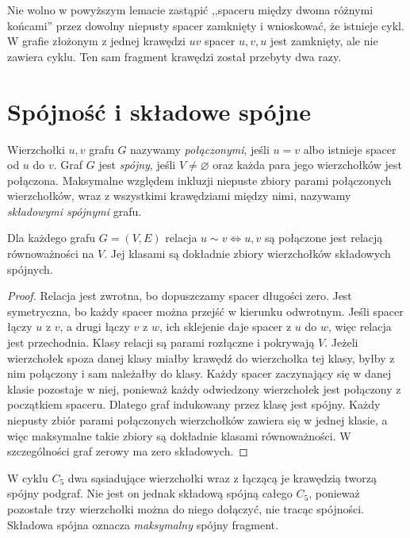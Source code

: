 \begin{uwaga}
Nie wolno w powyższym lemacie zastąpić ,,spaceru między
dwoma różnymi końcami'' przez dowolny niepusty spacer
zamknięty i wnioskować, że istnieje cykl. W grafie złożonym z jednej krawędzi $uv$
spacer $u,v,u$ jest zamknięty, ale nie zawiera cyklu.
Ten sam fragment krawędzi został przebyty dwa razy.
\end{uwaga}

\section{Spójność i składowe spójne}
\label{sec:tg-spojnosc}

\begin{definicja}[Spójność]
Wierzchołki $u,v$ grafu $G$ nazywamy
\emph{połączonymi}, jeśli $u=v$ albo istnieje
spacer od $u$ do $v$. Graf $G$ jest \emph{spójny},
jeśli $V\ne\varnothing$ oraz każda para jego wierzchołków jest połączona.
Maksymalne względem inkluzji niepuste zbiory parami połączonych
wierzchołków, wraz z wszystkimi krawędziami między nimi,
nazywamy \emph{składowymi spójnymi} grafu.
\end{definicja}

\begin{stwierdzenie}
Dla każdego grafu $G=(V,E)$ relacja
$u\sim v\iff u,v$ są połączone jest relacją
równoważności na $V$. Jej klasami są dokładnie
zbiory wierzchołków składowych spójnych.
\end{stwierdzenie}

\begin{proof}
Relacja jest zwrotna, bo dopuszczamy spacer długości zero.
Jest symetryczna, bo każdy spacer można przejść w kierunku
odwrotnym. Jeśli spacer łączy $u$ z $v$, a drugi łączy
$v$ z $w$, ich sklejenie daje spacer z $u$ do $w$,
więc relacja jest przechodnia. Klasy relacji są
parami rozłączne i pokrywają $V$. Jeżeli wierzchołek
spoza danej klasy miałby krawędź do wierzchołka tej klasy,
byłby z nim połączony i sam należałby do klasy. Każdy spacer zaczynający się w danej klasie pozostaje
w niej, ponieważ każdy odwiedzony wierzchołek jest połączony
z początkiem spaceru. Dlatego graf indukowany przez klasę
jest spójny. Każdy niepusty zbiór parami połączonych
wierzchołków zawiera się w jednej klasie, a więc maksymalne
takie zbiory są dokładnie klasami równoważności.
W szczególności graf zerowy ma zero składowych.
\end{proof}

\begin{przyklad}
W cyklu $C_5$ dwa sąsiadujące wierzchołki wraz z
łączącą je krawędzią tworzą spójny podgraf. Nie jest
on jednak składową spójną całego $C_5$, ponieważ
pozostałe trzy wierzchołki można do niego dołączyć,
nie tracąc spójności. Składowa spójna oznacza
\emph{maksymalny} spójny fragment.
\end{przyklad}

